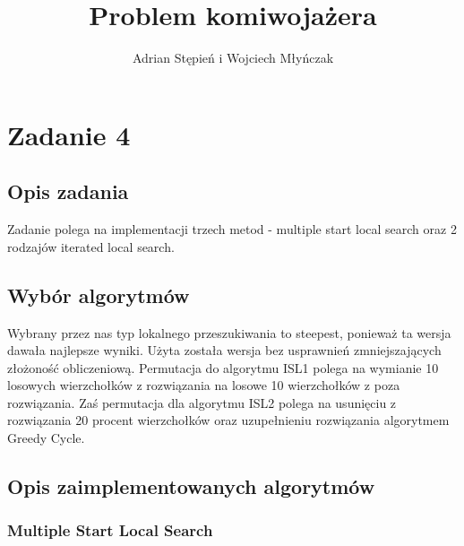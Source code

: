 \documentclass[a4paper]{article}
\title{Problem komiwojażera}
\author{Adrian Stępień i Wojciech Młyńczak}
\begin{document}
\maketitle

\section{Zadanie 4}

\subsection{Opis zadania}

Zadanie polega na implementacji trzech metod - multiple start local search oraz 2 rodzajów iterated local search.

\subsection{Wybór algorytmów}
Wybrany przez nas typ lokalnego przeszukiwania to steepest, ponieważ ta wersja dawała najlepsze wyniki. Użyta została wersja bez usprawnień zmniejszających złożoność obliczeniową. Permutacja do algorytmu ISL1 polega na wymianie 10 losowych wierzchołków z rozwiązania na losowe 10 wierzchołków z poza rozwiązania.
Zaś permutacja dla algorytmu ISL2 polega na usunięciu z rozwiązania 20 procent wierzchołków oraz uzupełnieniu rozwiązania algorytmem Greedy Cycle.

\subsection{Opis zaimplementowanych algorytmów}

\subsubsection{Multiple Start Local Search}
\end{document}
